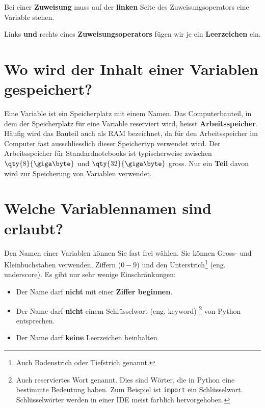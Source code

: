 \begin{important}
	Bei einer \textbf{Zuweisung} muss auf der \textbf{linken} Seite des Zuweisungsoperators eine Variable stehen.  
\end{important}

\begin{cleancode}[Leerzeichen 2]
Links \textbf{und} rechts eines \textbf{Zuweisungsoperators} fügen wir je ein \textbf{Leerzeichen} ein.
\end{cleancode}

\section{Wo wird der Inhalt einer Variablen gespeichert?}

Eine Variable ist ein Speicherplatz mit einem Namen. Das Computerbauteil, in dem der Speicherplatz für eine Variable reserviert wird, heisst \textbf{Arbeitsspeicher}. Häufig wird das Bauteil auch als \ac{RAM} bezeichnet, da für den Arbeitsspeicher im Computer fast ausschliesslich dieser Speichertyp verwendet wird. Der Arbeitsspeicher für Standardnotebooks ist typischerweise zwischen $\qty{8}{\giga\byte}$ und $\qty{32}{\giga\byte}$ gross. Nur ein \textbf{Teil} davon wird zur Speicherung von Variablen verwendet. 

\section{Welche Variablennamen sind erlaubt?}

Den Namen einer Variablen können Sie fast frei wählen. Sie können Gross- und Kleinbuchstaben verwenden, Ziffern ($0-9$) und den Unterstrich\footnote{Auch Bodenstrich oder Tiefstrich genannt.} (eng. underscore). Es gibt nur sehr wenige Einschränkungen:

\begin{itemize}
\item Der Name darf \textbf{nicht} mit einer \textbf{Ziffer beginnen}.
\item Der Name darf \textbf{nicht} einem Schlüsselwort (eng. keyword) \footnote{Auch reserviertes Wort genannt. Dies sind Wörter, die in Python eine bestimmte Bedeutung haben. Zum Beispiel ist \lstinline{import} ein Schlüsselwort. Schlüsselwörter werden in einer \ac{IDE} meist farblich hervorgehoben.} von Python entsprechen.
\item Der Name darf \textbf{keine} Leerzeichen beinhalten.
\end{itemize}

